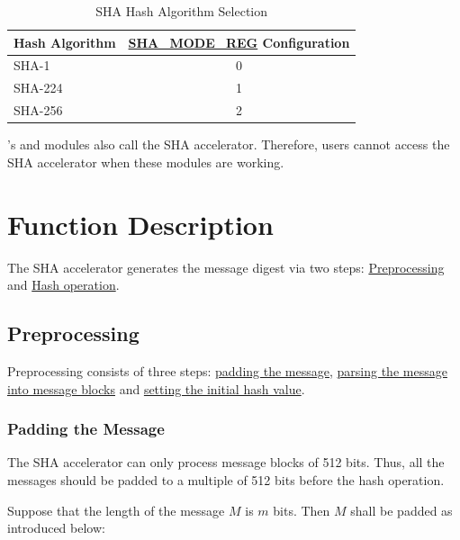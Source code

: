 \documentclass[main\_\_EN.tex]{subfiles}
\begin{document}
\begin{longtable}[c]{| l | c |}
\caption{SHA Hash Algorithm Selection}
\label{tab:sha-mode-summ}
\\\hline
\rowcolor{lightgray}
\textbf{Hash Algorithm} & \textbf{\hyperref[regdesc:SHAMODEREG]{SHA\_MODE\_REG} Configuration}\\
    \hline
    SHA-1 & 0\\
    \hline
    SHA-224 & 1\\
    \hline
    SHA-256 & 2 \\\hline 
\end{longtable}


\begin{importantlisting}
\vspace{-0.5em}

    \chipname{}'s  and  modules also call the SHA accelerator. Therefore, users cannot access the SHA accelerator when these modules are working.
\end{importantlisting}

\section{Function Description}

The SHA accelerator generates the message digest via two steps: \hyperref[sec:sha-preprocessing]{Preprocessing} and  \hyperref[sec:sha-hash-operation]{Hash operation}.

\subsection{Preprocessing}\label{sec:sha-preprocessing}

Preprocessing consists of three steps: \hyperref[sec:sha-text-padding]{padding the message}, \hyperref[sec:sha-parsing-message]{parsing the message into message blocks} and \hyperref[sec:sha-initial-hash]{setting the initial hash value}.

\subsubsection{Padding the Message}\label{sec:sha-text-padding}

The SHA accelerator can only process message blocks of 512 bits. Thus, all the messages should be padded to a multiple of 512 bits before the hash operation.

Suppose that the length of the message \begin{math}M\end{math} is \begin{math} m \end{math} bits. Then \begin{math} M \end{math} shall be padded as introduced below:
\end{document}
